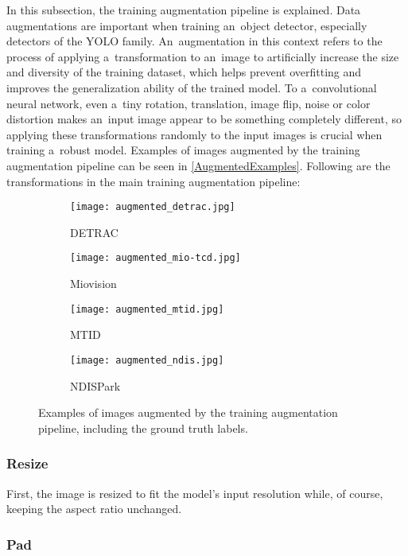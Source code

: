 In this subsection, the training augmentation pipeline is explained. Data
augmentations are important when training an~object detector, especially
detectors of the YOLO family. An~augmentation in this context refers to the
process of applying a~transformation to an~image to artificially increase the
size and diversity of the training dataset, which helps prevent overfitting and
improves the generalization ability of the trained model. To a~convolutional
neural network, even a~tiny rotation, translation, image flip, noise or color
distortion makes an~input image appear to be something completely different, so
applying these transformations randomly to the input images is crucial when
training a~robust model. Examples of images augmented by the training
augmentation pipeline can be seen in \autoref{AugmentedExamples}. Following are
the transformations in the main training augmentation pipeline:

\begin{figure}[t]
    \centering
    \begin{subfigure}[b]{0.49\textwidth}
        \texttt{[image: augmented\_detrac.jpg]}
        \caption{DETRAC}
    \end{subfigure}
    \begin{subfigure}[b]{0.49\textwidth}
        \texttt{[image: augmented\_mio-tcd.jpg]}
        \caption{Miovision}
    \end{subfigure}
    \begin{subfigure}[b]{0.49\textwidth}
        \texttt{[image: augmented\_mtid.jpg]}
        \caption{MTID}
    \end{subfigure}
    \begin{subfigure}[b]{0.49\textwidth}
        \texttt{[image: augmented\_ndis.jpg]}
        \caption{NDISPark}
    \end{subfigure}
    \caption{Examples of images augmented by the training augmentation pipeline,
    including the ground truth labels.}
    \label{AugmentedExamples}
\end{figure}


\subsubsection*{Resize}

First, the image is resized to fit the model's input resolution while, of
course, keeping the aspect ratio unchanged.

\subsubsection*{Pad}

